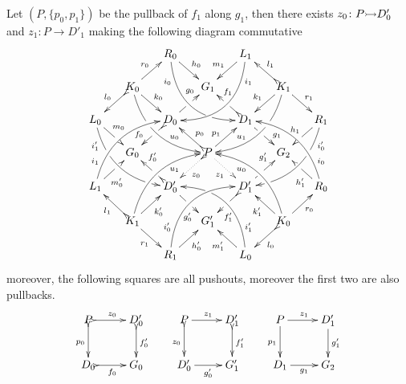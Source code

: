 \begin{lemma}
Let $(P, \{p_0, p_1\})$ be the pullback of $f_1$ along $g_1$, then there exists $z_0\colon P\mto D'_0$ and $z_1\colon P\to D'_1$ making the following diagram commutative
\[\xymatrix@C=15pt@R=15pt{&&R_0 \ar@/_.8cm/[ddrr]_(.2){i_0}|(.7)\hole
	\ar[dr]^{h_0}&& L_1\ar@/^.8cm/[ddll]^(.2){i_1}
	\ar[dl]_{m_1}\\&K_0\ar[dr]^{k_0}\ar@{>->}[dl]_{l_0}
	\ar@/_.6cm/[ddrr]|(.36)\hole^(.65){u_0}\ar[ur]^{r_0}&& G_1 &&
	K_1
	\ar@/^.6cm/[ddll]|(.36)\hole_(.65){u_1}\ar[dl]_{k_1}\ar@{>->}[lu]_{l_1}
	\ar[dr]^{r_1}\\L_0
	\ar@/_.6cm/[ddrr]_(.2){i'_1}|(.31)\hole|(.81)\hole
	\ar[dr]^(.4){m_0}|(.61)\hole && D_0
	\ar@{>->}[dl]|(.4)\hole_(.65){f_0}\ar[ur]|(.5)\hole^(.7){g_0}&&D_1
	\ar[dr]|(.4)\hole^(.65){g_1}
	\ar@{>->}[ul]|(.5)\hole_(.65){f_1}&&R_1\ar@/^.6cm/[ddll]^(.2){i'_0}|(.31)\hole|(.81)\hole\ar[dl]_{h_1}|(.6)\hole\\&G_0
	&&P\ar@{.>}[dr]_{z_1}	\ar@{>.>}[dl]^{z_0}\ar[ur]^(.4){p_1}\ar@{>->}[ul]_(.4){p_0}&&G_2\\L_1	\ar@/^.6cm/[uurr]^(.2){i_1} \ar[ur]_(.35){m'_0}|(.61)\hole && D'_0	\ar@{>->}[ul]|(.4)\hole_(.65){f'_0}\ar[dr]|(.5)\hole_(.65){g'_0}	&&D'_1\ar[ur]|(.4)\hole^(.65){g'_1} \ar@{>->}[dl]|(.5)\hole^(.65){f'_1}	&& R_0 \ar[ul]^(.35){h'_1}|(.61)\hole\ar@/_.6cm/[uull]_(.2){i_0}\\ &K_1	\ar[ur]_{k'_0} \ar[dr]_{r_1}	\ar@{>->}[ul]^{l_1}\ar@/^.6cm/[uurr]_(.65){u_1}&&G'_1&& K_0\ar[ur]_{r_0} \ar[ul]^{k'_1} \ar@{>->}[dl]^{l_0} \ar@/_.6cm/[uull]^(.65){u_0}\\&& R_1	\ar[ur]_{h'_0}\ar@/^.8cm/[uurr]^(.2){i'_0}&& L_0 \ar[ul]^{m'_1} \ar@/_.8cm/[uull]_(.2){i'_1} |(.69)\hole }\] 
moreover, the following squares are all pushouts, moreover the first two are also pullbacks.
\[\xymatrix{P \ar@{>->}[r]^{z_0} \ar@{>->}[d]_{p_0}& D'_0 \ar@{>->}[d]^{f'_0} &  P \ar@{>->}[d]_{z_0} \ar[r]^{z_1} & D'_1 \ar@{>->}[d]^{f'_1} & P\ar[r]^{z_1} \ar[d]_{p_1}&D'_1 \ar[d]^{g'_1}\\ D_0 \ar@{>->}[r]_{f_0} & G_0 & D'_0 \ar[r]_{g'_0}& G'_1 & D_1 \ar[r]_{g_1}& G_2}\]
\end{lemma}
